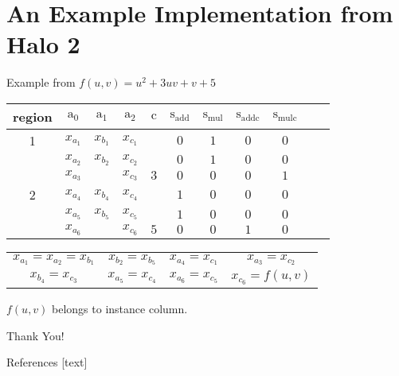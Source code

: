 \documentclass{beamer}
\begin{document}
	\section{An Example Implementation from Halo 2}
	\begin{frame}{Example from $f(u, v) = u^2 + 3uv + v + 5$}
		\begin{tabular}{|c|c|c|c|c|c|c|c|c|c|c|}
			\hline
			region&$\text{a}_0$&$\text{a}_1$&$\text{a}_2$&$\text{c}$&$\text{s}_\text{add}$&$\text{s}_\text{mul}$&$\text{s}_\text{addc}$&$\text{s}_\text{mulc}$\\
			\hline
			1&$x_{a_1}$&$x_{b_1}$&$x_{c_1}$& & $0$ & $1$ & $0$ & $0$ \\
			&$x_{a_2}$&$x_{b_2}$&$x_{c_2}$& & $0$ & $1$ & $0$ & $0$\\
			&$x_{a_3}$&&$x_{c_3}$& $3$ & $0$ & $0$ & $0$ & $1$ \\
			\hline
			2&$x_{a_4}$&$x_{b_4}$&$x_{c_4}$& & $1$ & $0$ & $0$ & $0$ \\
			&$x_{a_5}$&$x_{b_5}$&$x_{c_5}$& & $1$ & $0$ & $0$ & $0$\\
			&$x_{a_6}$&&$x_{c_6}$& $5$ & $0$ & $0$ & $1$ & $0$\\
			\hline
		\end{tabular}
		
		\begin{tabular}{cccc}
			$x_{a_1} = x_{a_2} = x_{b_1}$ & $x_{b_2} = x_{b_5}$ &$x_{a_4} = x_{c_1}$ & $x_{a_3} = x_{c_2}$\\ 
			$x_{b_4} = x_{c_3}$ & $x_{a_5} = x_{c_4}$ & $x_{a_6} = x_{c_5}$ & $x_{c_6} = f(u,v)$
		\end{tabular}
		
		$f(u, v)$ belongs to instance column.
	\end{frame}

	\begin{frame}{}
		\begin{center}
			{\fontsize{20}{20}\selectfont Thank You!}
		\end{center}
	\end{frame}

	\begin{frame}[allowframebreaks]{References}
		
		
		
	\end{frame}
	
\end{document}
